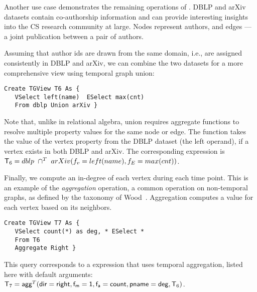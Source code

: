 Another use case demonstrates the remaining operations of \tga.  DBLP
and arXiv datasets contain co-authorship information and can provide
interesting insights into the CS research community at large.  Nodes
represent authors, and edges --- a joint publication between a pair of
authors.

\begin{example}
\label{ex:union}

Assuming that author ids are drawn from the same domain, i.e., are
assigned consistently in DBLP and arXiv, we can combine the two
datasets for a more comprehensive view using temporal graph union:

\begin{small}
\begin{verbatim}
Create TGView T6 As {
   VSelect left(name)  ESelect max(cnt)
   From dblp Union arXiv }
\end{verbatim}
\end{small}

Note that, unlike in relational algebra, \tga union requires aggregate
functions to resolve multiple property values for the same node or
edge.  The  function takes the value of the vertex
property  from the DBLP dataset (the left operand), if a
vertex exists in both DBLP and arXiv. The corresponding \tga
expression is $\mathsf{T}_6 =
dblp~\cap^T~arXiv(f_v=left(name),f_E=max(cnt))$.

\end{example}

\begin{example}
\label{ex:agg}

Finally, we compute an in-degree of each vertex during each time
point.  This is an example of the {\em aggregation} operation, a
common operation on non-temporal graphs, as defined by the taxonomy of
Wood~\cite{Wood2012}.  Aggregation computes a value for each vertex
based on its neighbors.

\begin{small} 
\begin{verbatim}
Create TGView T7 As { 
   VSelect count(*) as deg, * ESelect *
   From T6
   Aggregate Right }
\end{verbatim}
\end{small}

This query corresponds to a \tra expression that uses temporal
aggregation, listed here with default arguments: $\mathsf{T}_7 =
\textsf{agg}^T(\mathsf{dir=right},\mathsf{f_m=1},\mathsf{f_a=count},\mathsf{pname=deg},\mathsf{T}_6)$.

\end{example}

